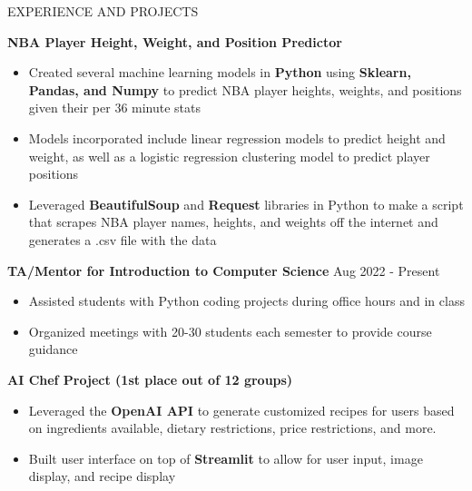 \documentclass{resume} %
\begin{document}
\begin{rSection}{EXPERIENCE AND PROJECTS}


\item \textbf{NBA Player Height, Weight, and Position Predictor} %
\vspace{-6pt}
 \begin{itemize}
    \itemsep -6pt {} 
     \item Created several machine learning models in \textbf{Python} using \textbf{Sklearn, Pandas, and Numpy} to predict NBA player heights, weights, and positions given their per 36 minute stats
     \item Models incorporated include linear regression models to predict height and weight, as well as a logistic regression clustering model to predict player positions
    \item Leveraged \textbf{BeautifulSoup} and \textbf{Request} libraries in Python to make a script that scrapes NBA player names, heights, and weights off the internet and generates a .csv file with the data
 \end{itemize}



 \textbf{TA/Mentor for Introduction to Computer Science} \hfill Aug 2022 - Present%
\vspace{-6pt}
 \begin{itemize}
    \itemsep -6pt {} 
     \item Assisted students with Python coding projects during office hours and in class
     \item Organized meetings with 20-30 students each semester to provide course guidance
 \end{itemize}

 \textbf{AI Chef Project (1st place out of 12 groups)} \hfill %
\vspace{-6pt}
 \begin{itemize}
    \itemsep -6pt {} 
     \item Leveraged the \textbf{OpenAI API} to generate customized recipes for users based on ingredients available, dietary restrictions, price restrictions, and more.
     \item Built user interface on top of \textbf{Streamlit} to allow for user input, image display, and recipe display
 \end{itemize}
 

\end{rSection}
\end{document}

